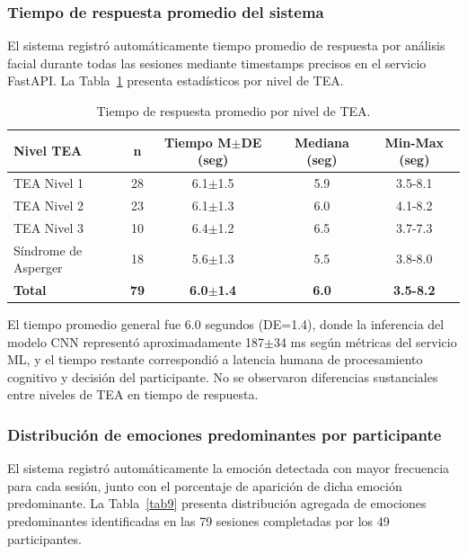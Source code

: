 \documentclass[journal,article,submit,pdftex,moreauthors]{Definitions/mdpi}
\begin{document}
	\subsubsection{Tiempo de respuesta promedio del sistema}
	
	El sistema registró automáticamente tiempo promedio de respuesta por análisis facial durante todas las sesiones mediante timestamps precisos en el servicio FastAPI. La Tabla~\ref{tab8} presenta estadísticos por nivel de TEA.
	
	\begin{table}[H]
		\caption{Tiempo de respuesta promedio por nivel de TEA.\label{tab8}}
		\begin{tabularx}{\textwidth}{lcccc}
			\toprule
			\textbf{Nivel TEA} & \textbf{n} & \textbf{Tiempo M$\pm$DE (seg)} & \textbf{Mediana (seg)} & \textbf{Min-Max (seg)} \\
			\midrule
			TEA Nivel 1 & 28 & 6.1$\pm$1.5 & 5.9 & 3.5-8.1 \\
			TEA Nivel 2 & 23 & 6.1$\pm$1.3 & 6.0 & 4.1-8.2 \\
			TEA Nivel 3 & 10 & 6.4$\pm$1.2 & 6.5 & 3.7-7.3 \\
			Síndrome de Asperger & 18 & 5.6$\pm$1.3 & 5.5 & 3.8-8.0 \\
			\textbf{Total} & \textbf{79} & \textbf{6.0$\pm$1.4} & \textbf{6.0} & \textbf{3.5-8.2} \\
			\bottomrule
		\end{tabularx}
	\end{table}
	
	El tiempo promedio general fue 6.0 segundos (DE=1.4), donde la inferencia del modelo CNN representó aproximadamente 187$\pm$34 ms según métricas del servicio ML, y el tiempo restante correspondió a latencia humana de procesamiento cognitivo y decisión del participante. No se observaron diferencias sustanciales entre niveles de TEA en tiempo de respuesta.
	
	\subsubsection{Distribución de emociones predominantes por participante}
	
	El sistema registró automáticamente la emoción detectada con mayor frecuencia para cada sesión, junto con el porcentaje de aparición de dicha emoción predominante. La Tabla~\ref{tab9} presenta distribución agregada de emociones predominantes identificadas en las 79 sesiones completadas por los 49 participantes.
	
\end{document}

